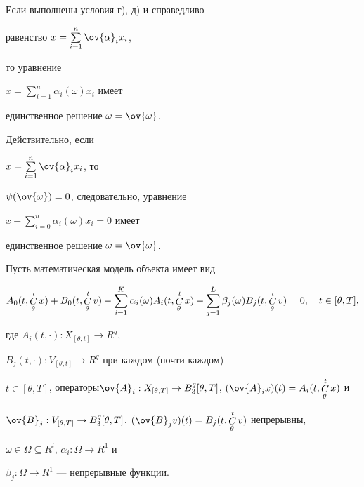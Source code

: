 \begin{cornonum}


Если выполнены условия г), д) и справедливо


равенство $x=\sum\limits^n_{i=1}\ov{\alpha}_ix_i$,


то уравнение


$x=\sum\limits^n_{i=1}\alpha_i(\omega)x_i$ имеет


единственное решение $\omega=\ov{\omega}$.


\end{cornonum}





Действительно, если


$x=\sum\limits^n_{i=1}\ov{\alpha}_ix_i$, то


$\psi(\ov{\omega})=0$, следовательно, уравнение


$x-\sum\limits^n_{i=0}\alpha_i(\omega)x_i=0$ имеет


единственное решение $\omega=\ov{\omega}$.





Пусть математическая модель объекта имеет вид


\begin{equation}


A_0(t,\Cu_{\theta}^t x)+B_0(t,\Cu_\theta^t


v)-\sum\limits_{i=1}^K\alpha_i(\omega)A_i(t,\Cu_{\theta}^t x)-


\sum\limits^L_{j=1}\beta_j(\omega)B_j(t,\Cu^t_\theta v)=0, \quad


t\in[\theta,T],


\end{equation}


где $A_i(t,\cdot):X_{[\theta,t]}\to R^q$, 


$B_j(t,\cdot):V_{[\theta,t]}\to R^q$ при каждом (почти каждом)


$t\in[\theta,T]$, операторы\linebreak $\ov{A}_i:X_{[\theta,T]}\to


B_3^q[\theta,T]$, $(\ov{A}_i x)(t)=A_i(t,\Cu^t_\theta x)$ и


$\ov{B}_j:V_{[\theta,T]}\to B_3^q[\theta,T]$, $(\ov{B}_j


v)(t)=B_j(t,\Cu^t_\theta v)$ непрерывны,


$\omega\in\Omega\subseteq R^l$, $\alpha_i:\Omega\to R^1$ и


$\beta_j:\Omega\to R^1$ --- непрерывные функции.





